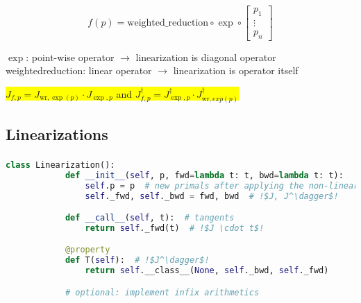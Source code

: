 \documentclass[aspectratio=169,xcolor=dvipsnames]{beamer}
\begin{document}
\begin{frame}
	\frametitle{\insertsection}
	\framesubtitle{\insertsubsection}

	\begin{equation*}
		f(p) =
		\text{weighted\_reduction}
		\circ
		\exp
		\circ
		\begin{bmatrix}
			p_{1} \\
			\vdots \\
			p_{n}
		\end{bmatrix}
	\end{equation*}

	\vspace{1em}
	$\exp$: point-wise operator $\rightarrow$ linearization is diagonal operator
	\\ weighted\textunderscore{}reduction: linear operator $\rightarrow$ linearization is operator itself

	\pause
	\vspace{2em}
	\begin{center}
		\colorbox{yellow}{
			$J_{f,p} = J_{\text{wr},\exp(p)} \cdot J_{\exp,p}$
			\hspace{2em}
			and
			\hspace{2em}
			$J_{f,p}^\dagger = J_{\exp,p}^\dagger \cdot J_{\text{wr},exp(p)}^\dagger$
		}
	\end{center}

\end{frame}

\subsection{Linearizations}
\begin{frame}[fragile]
	\frametitle{\insertsection}
	\framesubtitle{\insertsubsection}

	\begin{lstlisting}[language=python,escapechar=!]
		class Linearization():
			def __init__(self, p, fwd=lambda t: t, bwd=lambda t: t):
				self.p = p  # new primals after applying the non-linearized !$J$!
				self._fwd, self._bwd = fwd, bwd  # !$J, J^\dagger$!

			def __call__(self, t):  # tangents
				return self._fwd(t)  # !$J \cdot t$!

			@property
			def T(self):  # !$J^\dagger$!
				return self.__class__(None, self._bwd, self._fwd)

			# optional: implement infix arithmetics
	\end{lstlisting}

\end{frame}
\end{document}

